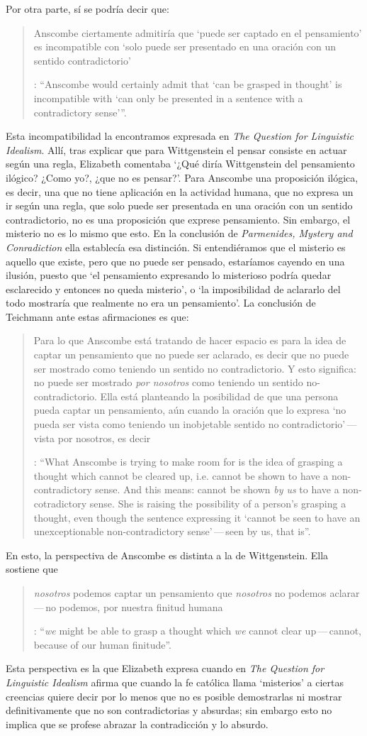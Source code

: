 Por otra parte, sí se podría decir que: \blockquote[{\Cite[212]{teichmann2008ans}}: \enquote{Anscombe would certainly admit that `can be grasped in thought' is incompatible with `can only be presented in a sentence with a contradictory sense'}.]{Anscombe ciertamente admitiría que `puede ser captado en el pensamiento' es incompatible con `solo puede ser presentado en una oración con un sentido contradictorio'}. Esta incompatibilidad la encontramos expresada en \emph{The Question for Linguistic Idealism}. Allí, tras explicar que para Wittgenstein el pensar consiste en actuar según una regla, Elizabeth comentaba \enquote*{¿Qué diría Wittgenstein del pensamiento ilógico? ¿Como yo?, ¿que no es pensar?}. Para Anscombe una proposición ilógica, es decir, una que no tiene aplicación en la actividad humana, que no expresa un ir según una regla, que solo puede ser presentada en una oración con un sentido contradictorio, no es una proposición que exprese pensamiento. Sin embargo, el misterio no es lo mismo que esto. En la conclusión de \emph{Parmenides, Mystery and Conradiction} ella establecía esa distinción. Si entendiéramos que el misterio es aquello que existe, pero que no puede ser pensado, estaríamos cayendo en una ilusión, puesto que \enquote*{el pensamiento expresando lo misterioso podría quedar esclarecido y entonces no queda misterio}, o \enquote*{la imposibilidad de aclararlo del todo mostraría que realmente no era un pensamiento}. La conclusión de Teichmann ante estas afirmaciones es que: \blockquote[{\Cite[212]{teichmann2008ans}}: \enquote{What Anscombe is trying to make room for is the idea of grasping a thought which cannot be cleared up, i.e. cannot be shown to have a non-contradictory sense. And this means: cannot be shown \emph{by us} to have a non-cotradictory sense. She is raising the possibility of a person's grasping a thought, even though the sentence expressing it `cannot be seen to have an unexceptionable non-contradictory sense'\,---\,seen by us, that is}.]{Para lo que Anscombe está tratando de hacer espacio es para la idea de captar un pensamiento que no puede ser aclarado, es decir que no puede ser mostrado como teniendo un sentido no contradictorio. Y esto significa: no puede ser mostrado \emph{por nosotros} como teniendo un sentido no-contradictorio. Ella está planteando la posibilidad de que una persona pueda captar un pensamiento, aún cuando la oración que lo expresa `no pueda ser vista como teniendo un inobjetable sentido no contradictorio'\,---\,vista por nosotros, es decir}.

En esto, la perspectiva de Anscombe es distinta a la de Wittgenstein. Ella sostiene que \blockquote[{\Cite[213]{teichmann2008ans}}: \enquote{\emph{we} might be able to grasp a thought which \emph{we} cannot clear up\,---\,cannot, because of our human finitude}.]{\emph{nosotros} podemos captar un pensamiento que \emph{nosotros} no podemos aclarar\,---\,no podemos, por nuestra finitud humana}. Esta perspectiva es la que Elizabeth expresa cuando en \emph{The Question for Linguistic Idealism} afirma que cuando la fe católica llama `misterios' a ciertas creencias quiere decir por lo menos que no es posible demostrarlas ni mostrar definitivamente que no son contradictorias y absurdas; sin embargo esto no implica que se profese abrazar la contradicción y lo absurdo.

